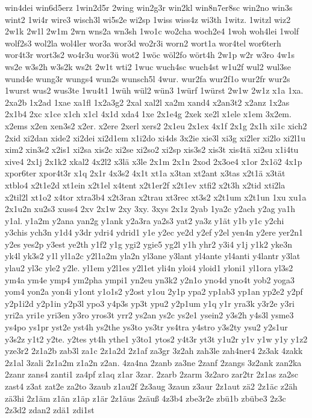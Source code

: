 {win4dei
win6d5erz
1win2d5r
2wing
win2g3r
win2kl
win8n7er8sc
win2no
win3s
wint2
1wi4r
wire3
wisch3l
wi5s2e
wi2sp
1wiss
wiss4z
wi3th
1witz.
1witzl
wiz2
2w1k
2w1l
2w1m
2wn
wns2a
wn3sh
1wo1c
wo2cha
woch2e4
1woh
woh4lei
1wolf
wolf2s3
wol2la
wol4ler
wor3a
wor3d
wo2r3i
worn2
wort1a
wor4tel
wor6terh
wor4t3r
wort3s2
wo4r3u
wor3ü
wot2
1wöc
wöl2fo
wört4h
2w1p
w2r
w3ro
4w1s
ws2e
w3s2h
w3s2k
ws2t
2w1t
wti2
1wuc
wuch4sc
wuch4st
w1u2f
wul2
wul3se
wund4e
wung3r
wungs4
wun2s
wunsch5l
4wur.
wur2fa
wur2f1o
wur2fr
wur2s
1wurst
wus2
wus3te
1wu4t1
1wüh
wül2
wün3
1würf
1würst
2w1w
2w1z
x1a
1xa.
2xa2b
1x2ad
1xae
xa1fl
1x2a3g2
2xal
xal2l
xa2m
xand4
x2an3t2
x2anz
1x2as
2x1b4
2xc
x1ce
x1ch
x1cl
4x1d
xda4
1xe
2x1e4g
2xek
xe2l
x1ele
x1em
3x2em.
x2ems
x2en
xen3s2
x2er.
x2ere
2xerl
xers2
2x1eu
2x1ex
4x1f
2x1g
2x1h
xi1c
xich2
2xid
xi2dan
xide2
xi2dei
xi2d1em
x1i2do
xi4ds
3x2ie
xie3l
xi3g
xi2ler
xi2lo
xi2l1u
xim2
xin3s2
x2is1
xi2sa
xis2c
xi2se
xi2so2
xi2sp
xis3s2
xis3t
xis4tä
xi2su
x1i4tu
xive4
2x1j
2x1k2
xkal2
4x2l2
x3lä
x3le
2x1m
2x1n
2xod
2x3oe4
x1or
2x1ö2
4x1p
xpor6ter
xpor4t3r
x1q
2x1r
4x3s2
4x1t
xt1a
x3tan
xt2ant
x3tas
x2t1ä
x3tät
xtblo4
x2t1e2d
xt1ein
x2t1el
x4tent
x2t1er2f
x2t1ev
xtfi2
x2t3h
x2tid
xti2la
x2til2l
xt1o2
x4tor
xtra3b4
x2t3ran
x2trau
xt3rec
xt3s2
x2t1um
x2t1un
1xu
xu1a
2x1u2n
xu2s3
xuss4
2xv
2x1w
2xy
3xy.
3xys
2x1z
2yab
1ya2c
y2ach
y2ag
ya1h
y1al.
y1a2m
y2ana
yan2g
y1ank
y2a3ra
ya2s3
yat2
ya3z
y1ät
y1b
y1c
y2chi
y3chis
ych3n
y1d4
y3dr
ydri4
ydrid1
y1e
y2ec
ye2d
y2ef
y2el
yen4n
y2ere
yer2n1
y2es
yes2p
y3est
ye2th
y1f2
y1g
ygi2
ygie5
yg2l
y1h
yhr2
y3i4
y1j
y1k2
yke3n
yk4l
yk3s2
y1l
yl1a2c
y2l1a2m
yla2n
yl3ane
y3lant
yl4ante
yl4anti
y4lantr
y3lat
ylau2
yl3c
yle2
y2le.
yl1em
y2l1es
y2l1et
yli4n
yloi4
yloid1
yloni1
yl1ora
yl3s2
ym4a
ym4e
ymp4
ym2pha
ympi1
yn2eu
yn3k2
y2n1o
yno4d
yno4t
yob2
yoga3
yom4
yon2a
yon4i
y1ont
y1o1s2
y2ost
y1ou
2y1p
ypa2
yp1ab3
yp1an
yp2e2
y2pf
y2p1i2d
y2p1in
y2p3l
ypo3
y4p3s
yp3t
ypu2
y2p1um
y1q
y1r
yra3k
y3r2e
y3ri
yri2a
yri1e
yri3en
y3ro
yros3t
yrr2
ys2an
ys2c
ys2e1
ysein2
y3s2h
y4s3l
ysme3
ys4po
ys1pr
yst2e
yst4h
ys2the
ys3to
ys3tr
ys4tra
y4stro
y3s2ty
ysu2
y2s1ur
y3s2z
y1t2
y2te.
y2tes
yt4h
ythe1
y3to1
ytos2
y4t3r
yt3t
y1u2r
y1v
y1w
y1y
y1z2
yze3r2
2z1a2b
zab3l
za1c
2z1a2d
2z1af
za3gr
3z2ah
zah3le
zah4ner4
2z3ak
4zakk
2z1al
3zali
2z1a2m
z1a2n
z2an.
4za4na
2zanb
za3ne
2zanf
2zangs
3z2ank
zan2ka
2zanr
zans4
zanti1
za4pf
z1aq
z1ar
3zar.
2zarb
2zarm
3z2aro
zar2tr
2z1as
za2sc
zast4
z3at
zat2e
za2to
3zaub
z1au2f
2z3aug
3zaun
z3aur
2z1aut
zä2
2z1äc
z2äh
zä3hi
2z1äm
z1än
z1äp
z1är
2z1äus
2zäuß
4z3b4
zbe3r2e
zbü1b
zbübe3
2z3c
2z3d2
zdan2
zdä1
zdi1st
}
